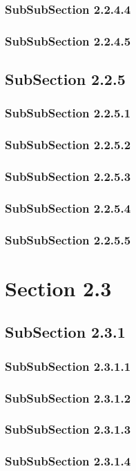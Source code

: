 \subsubsection{SubSubSection 2.2.4.4}
\subsubsection{SubSubSection 2.2.4.5}
\subsection{SubSection 2.2.5}
\subsubsection{SubSubSection 2.2.5.1}
\subsubsection{SubSubSection 2.2.5.2}
\subsubsection{SubSubSection 2.2.5.3}
\subsubsection{SubSubSection 2.2.5.4}
\subsubsection{SubSubSection 2.2.5.5}
\section{Section 2.3}
\subsection{SubSection 2.3.1}
\subsubsection{SubSubSection 2.3.1.1}
\subsubsection{SubSubSection 2.3.1.2}
\subsubsection{SubSubSection 2.3.1.3}
\subsubsection{SubSubSection 2.3.1.4}

